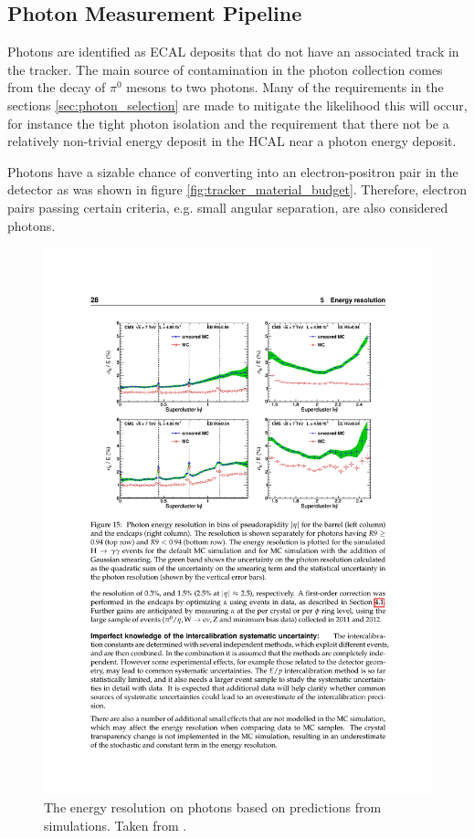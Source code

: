     \FloatBarrier

  \subsection{Photon Measurement Pipeline} \label{sec:photon_measurement_pipeline}
    Photons are identified as ECAL deposits that do not have an associated track in the tracker. The main source of contamination in the photon collection comes from the decay of $\pi^0$ mesons to two photons.\cite{cms_photons} Many of the requirements in the sections \ref{sec:photon_selection} are made to mitigate the likelihood this will occur, for instance the tight photon isolation and the requirement that there not be a relatively non-trivial energy deposit in the HCAL near a photon energy deposit.

    Photons have a sizable chance of converting into an electron-positron pair in the detector as was shown in figure \ref{fig:tracker_material_budget}. Therefore, electron pairs passing certain criteria, e.g. small angular separation, are also considered photons. 

    \begin{figure}[h!]
      \centering
        \includegraphics[width=\textwidth]{figures/photon_E_resolution.pdf}
        \caption{The energy resolution on photons based on predictions from simulations. Taken from \cite{ecal_energy_reco}.}
        \label{fig:photon_E_resolution}
    \end{figure}

